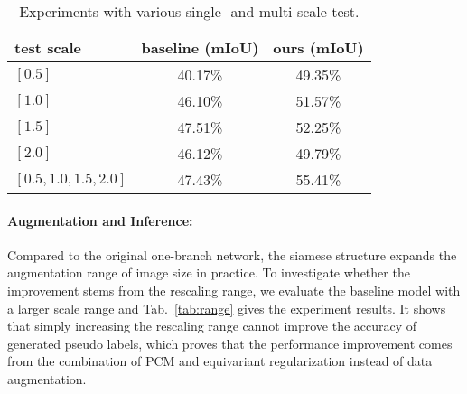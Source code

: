 \documentclass[10pt,twocolumn,letterpaper]{article}
\begin{document}
	\begin{table}[tbp]
		\centering
		\begin{tabular}{l|c|c}
			\hline
			test scale & baseline (mIoU) & ours (mIoU)\\
			\hline
			$[0.5]$ & 40.17\% & 49.35\%\\
			$[1.0]$ & 46.10\% & 51.57\%\\
			$[1.5]$ & 47.51\% & 52.25\%\\
			$[2.0]$ & 46.12\% & 49.79\%\\
			\hline
			$[0.5, 1.0, 1.5, 2.0]$ & 47.43\% & 55.41\%\\
			\hline
		\end{tabular}
		\caption{Experiments with various single- and multi-scale test.}
		\label{tab:singlemultiscale}
\end{table}
\paragraph{Augmentation and Inference:}
	Compared to the original one-branch network, the siamese structure expands the augmentation range of image size in practice. To investigate whether the improvement stems from the rescaling range, we evaluate the baseline model with a larger scale range and Tab.~\ref{tab:range} gives the experiment results. It shows that simply increasing the rescaling range cannot improve the accuracy of generated pseudo labels, which proves that the performance improvement comes from the combination of PCM and equivariant regularization instead of data augmentation.
	
\end{document}

